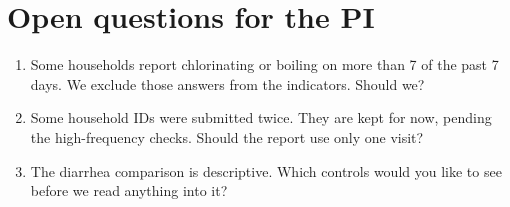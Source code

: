 \documentclass[11pt]{article}
\begin{document}
\section*{Open questions for the PI}

\begin{enumerate}
  \item Some households report chlorinating or boiling on more than 7 of the
    past 7 days. We exclude those answers from the indicators. Should we?
  \item Some household IDs were submitted twice. They are kept for now,
    pending the high-frequency checks. Should the report use only one visit?
  \item The diarrhea comparison is descriptive. Which controls would you like
    to see before we read anything into it?
\end{enumerate}
\end{document}
